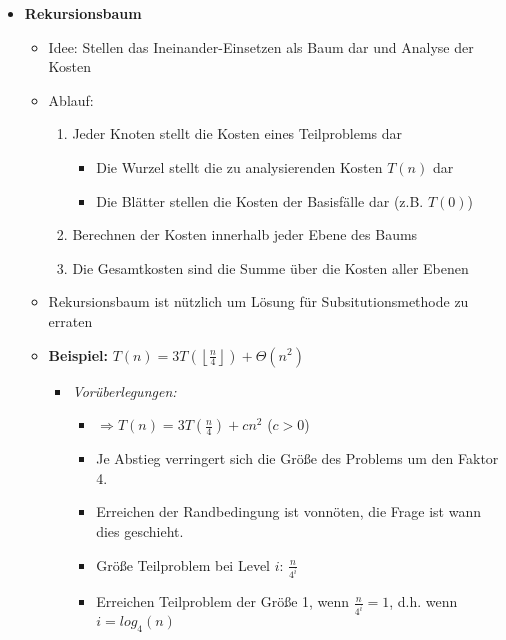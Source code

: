 \begin{itemize}
\pagebreak

        \item \textbf{Rekursionsbaum}
            \begin{itemize}
                \item Idee: Stellen das Ineinander-Einsetzen als Baum dar und Analyse der Kosten
                \item Ablauf:
                    \begin{enumerate}
                        \item Jeder Knoten stellt die Kosten eines Teilproblems dar 
                            \begin{itemize}
                                \item Die Wurzel stellt die zu analysierenden Kosten $T(n)$ dar 
                                \item Die Blätter stellen die Kosten der Basisfälle dar (z.B. $T(0)$)
                            \end{itemize}
                        \item Berechnen der Kosten innerhalb jeder Ebene des Baums
                        \item Die Gesamtkosten sind die Summe über die Kosten aller Ebenen
                    \end{enumerate}
                \item Rekursionsbaum ist nützlich um Lösung für Subsitutionsmethode zu erraten 
                \item \textbf{Beispiel:} $T(n) = 3T(\left \lfloor \frac{n}{4} \right \rfloor) + \Theta(n^2)$
                    \begin{itemize}
                        \item \textit{Vorüberlegungen:}
                            \begin{itemize}
                                \item $\Rightarrow T(n) = 3T(\frac{n}{4}) + cn^2$ ($c>0$)
                                \item Je Abstieg verringert sich die Größe des Problems um den Faktor 4. 
                                \item Erreichen der Randbedingung ist vonnöten, die Frage ist wann dies geschieht.
                                \item Größe Teilproblem bei Level $i$: $\frac{n}{4^i}$
                                \item Erreichen Teilproblem der Größe 1, wenn $\frac{n}{4^i}=1$, d.h. wenn $i=log_4(n)$ \\

\end{itemize}
\end{itemize}
\end{itemize}
\end{itemize}
